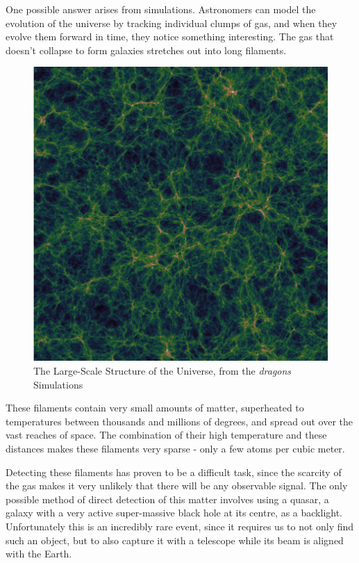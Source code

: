 \documentclass{article}
\begin{document}
One possible answer arises from simulations. Astronomers can model the evolution of the universe by tracking individual clumps of gas, and when they evolve them forward in time, they notice something interesting. The gas that doesn’t collapse to form galaxies stretches out into long filaments.
\begin{figure}[H]
    \begin{center}
        \includegraphics[scale=0.4]{tiamat-1.png}
        \caption{The Large-Scale Structure of the Universe, from the \textit{dragons} Simulations }
    \end{center}
\end{figure}

These filaments contain very small amounts of matter, superheated to temperatures between thousands and millions of degrees, and spread out over the vast reaches of space. The combination of their high temperature and these distances makes these filaments very sparse - only a few atoms per cubic meter. 

Detecting these filaments has proven to be a difficult task, since the scarcity of the gas makes it very unlikely that there will be any observable signal. The only possible method of direct detection of this matter involves using a quasar, a galaxy with a very active super-massive black hole at its centre, as a backlight. Unfortunately this is an incredibly rare event, since it requires us to not only find such an object, but to also capture it with a telescope while its beam is aligned with the Earth. 
\end{document}
